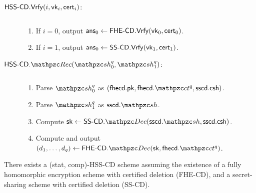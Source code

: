 \begin{description}
\item[$\mathsf{HSS\textrm{-}CD}.\mathsf{Vrfy}(i, \mathsf{vk}_i, \mathsf{cert}_i)$:] $ $

\begin{enumerate}
\item If $i = 0$, output $\mathsf{ans}_0 \leftarrow \mathsf{FHE\textrm{-}CD}.\mathsf{Vrfy}(\mathsf{vk}_0,
\mathsf{cert}_0)$.
\item If $i = 1$, output $\mathsf{ans}_0 \leftarrow \mathsf{SS\textrm{-}CD}.\mathsf{Vrfy}(\mathsf{vk}_1,
\mathsf{cert}_1)$.
\end{enumerate}

\item[$\HSScd.\Rec(\qsh_0^q, \qsh_1^q)$:] $ $

\begin{enumerate}
\item Parse $\qsh_0^q$ as $(\fhecd.\pk, \fhecd.\qct^q, \sscd.\csh)$.
\item Parse $\qsh_1^q$ as $\sscd.\qsh$.
\item Compute $\sk \leftarrow \SScd.\qDec(\sscd.\qsh, \sscd.\csh)$.
\item Compute and output $(d_1, \ldots, d_q) \leftarrow
\FHEcd.\qDec(\sk, \fhecd.\qct^q)$.

\end{enumerate}


\end{description}

\begin{theorem}
There exists a (stat, comp)-HSS-CD scheme assuming the existence of
a fully homomorphic encryption scheme with certified deletion
(FHE-CD), and a secret-sharing scheme with certified deletion
(SS-CD).
\end{theorem}

